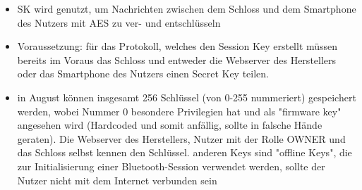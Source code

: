 \begin{itemize}
		    \item SK wird genutzt, um Nachrichten zwischen dem Schloss und dem Smartphone des Nutzers mit AES zu ver- und entschlüsseln
		    \item Voraussetzung: für das Protokoll, welches den Session Key erstellt müssen bereits im Voraus das Schloss und entweder die Webserver des Herstellers oder das Smartphone des Nutzers einen Secret Key teilen.
		    \item in August können insgesamt 256 Schlüssel (von 0-255 nummeriert) gespeichert werden, wobei Nummer 0 besondere Privilegien hat und als "firmware key" angesehen wird (\textrightarrow Hardcoded und somit anfällig, sollte in falsche Hände geraten).
		        Die Webserver des Herstellers, Nutzer mit der Rolle OWNER und das Schloss selbst kennen den Schlüssel.
		        anderen Keys sind "offline Keys", die zur Initialisierung einer Bluetooth-Session verwendet werden, sollte der Nutzer nicht mit dem Internet verbunden sein
		\end{itemize}
		
		
